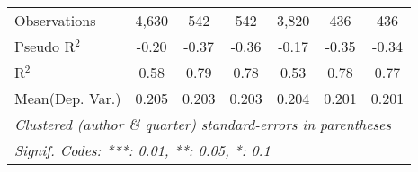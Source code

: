 \begin{tabular}{lcccccc}
   Observations                   & 4,630        & 542           & 542           & 3,820         & 436           & 436\\  
   Pseudo R$^2$                   & -0.20        & -0.37         & -0.36         & -0.17         & -0.35         & -0.34\\  
   R$^2$                          & 0.58         & 0.79          & 0.78          & 0.53          & 0.78          & 0.77\\  
Mean(Dep. Var.) & 0.205 & 0.203 & 0.203 & 0.204 & 0.201 & 0.201 \\
   \midrule \midrule
   \multicolumn{7}{l}{\emph{Clustered (author \& quarter) standard-errors in parentheses}}\\
   \multicolumn{7}{l}{\emph{Signif. Codes: ***: 0.01, **: 0.05, *: 0.1}}\\
\end{tabular}
\par\endgroup
